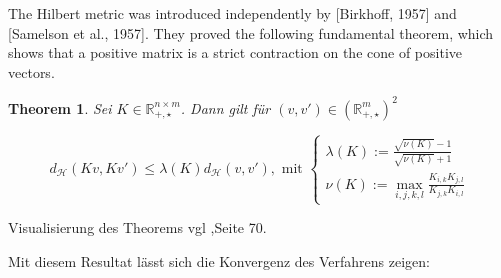 \documentclass[11pt,a4paper]{article}
\newtheorem{theorem}{Theorem}[subsection]
\numberwithin{equation}{section}
\begin{document}
		The Hilbert metric was introduced independently by [Birkhoff,
		1957] and [Samelson et al., 1957]. They proved the following fundamental theorem,
		which shows that a positive matrix is a strict contraction on the cone of positive
		vectors.
		
		\begin{theorem}\label{theorem41}
			Sei $K \in \mathbb{R}_{+,\star}^{n \times m}$. Dann gilt für $(v,v') \in (\mathbb{R}_{+, \star}^m)^2$
			
			\begin{equation}
			d_\mathcal{H}(Kv,Kv') \leq \lambda (K) d_\mathcal{H}(v,v'), \text{ mit } \begin{cases}
			\lambda (K) := \frac{\sqrt{\nu (K)} -1}{\sqrt{\nu (K)}+1}\\
			\nu (K) := \max_{i,j,k,l} \frac{K_{i,k}K_{j,l}}{K_{j,k}K_{i,l}}
			
			\end{cases}
			\end{equation}
		\end{theorem}
	
	Visualisierung des Theorems vgl \cite{COTcuturi},Seite 70.
	
	Mit diesem Resultat lässt sich die Konvergenz des Verfahrens zeigen:
	
\end{document}

